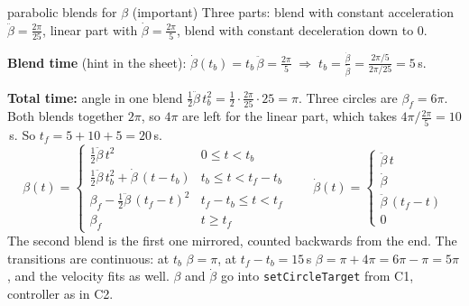 \documentclass[10pt,a4paper]{article}
\newcommand{\code}[1]{\texttt{#1}}
\begin{document}
\begin{herleitung}{parabolic blends for \texorpdfstring{$\beta$}{beta} (important)}
Three parts: blend with constant acceleration $\ddot\beta = \frac{2\pi}{25}$, linear part with
$\dot\beta = \frac{2\pi}{5}$, blend with constant deceleration down to 0.

\textbf{Blend time} (hint in the sheet): $\dot\beta(t_b) = t_b\,\ddot\beta = \frac{2\pi}{5}
\;\Rightarrow\; t_b = \frac{\dot\beta}{\ddot\beta} = \frac{2\pi/5}{2\pi/25} = 5$\,s.

\textbf{Total time:} angle in one blend $\frac12\ddot\beta\,t_b^2 = \frac12 \cdot \frac{2\pi}{25} \cdot 25 = \pi$. Three
circles are $\beta_f = 6\pi$. Both blends together $2\pi$, so $4\pi$ are left for the linear part, which takes
$4\pi / \frac{2\pi}{5} = 10$\,s. So $t_f = 5 + 10 + 5 = 20$\,s.
\[
  \beta(t) =
  \begin{cases}
    \frac12\ddot\beta\,t^2 & 0 \le t < t_b \\[2pt]
    \frac12\ddot\beta\,t_b^2 + \dot\beta\,(t - t_b) & t_b \le t < t_f - t_b \\[2pt]
    \beta_f - \frac12\ddot\beta\,(t_f - t)^2 & t_f - t_b \le t < t_f \\[2pt]
    \beta_f & t \ge t_f
  \end{cases}
  \qquad
  \dot\beta(t) =
  \begin{cases}
    \ddot\beta\,t \\[2pt]
    \dot\beta \\[2pt]
    \ddot\beta\,(t_f - t) \\[2pt]
    0
  \end{cases}
\]
The second blend is the first one mirrored, counted backwards from the end. The transitions are continuous: at $t_b$
$\beta = \pi$, at $t_f - t_b = 15$\,s $\beta = \pi + 4\pi = 6\pi - \pi = 5\pi$, and the velocity fits as well.
$\beta$ and $\dot\beta$ go into \code{setCircleTarget} from C1, controller as in C2.
\end{herleitung}
\end{document}
